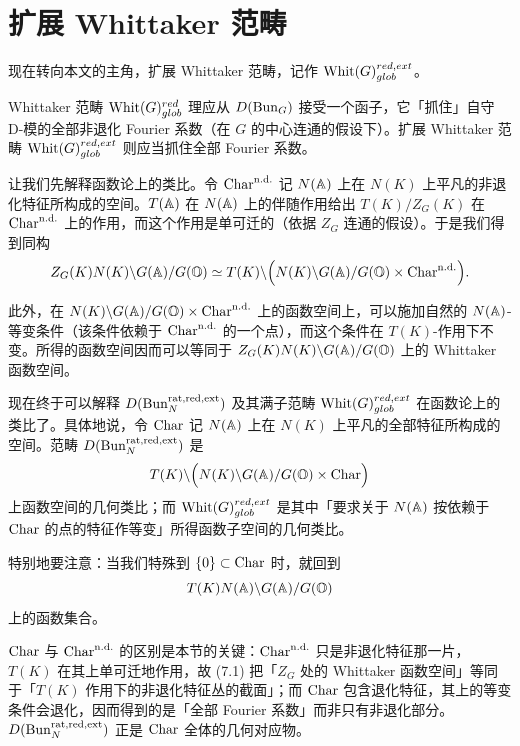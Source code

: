 \section{扩展 Whittaker 范畴}

现在转向本文的主角，扩展 Whittaker 范畴，记作 $\mathrm{Whit}(G)^{red,ext}_{glob}$。

Whittaker 范畴 $\mathrm{Whit}(G)^{red}_{glob}$ 理应从 $D(\operatorname{Bun}_G)$ 接受一个函子，它「抓住」自守 D-模的全部非退化 Fourier 系数（在 $G$ 的中心连通的假设下）。扩展 Whittaker 范畴 $\mathrm{Whit}(G)^{red,ext}_{glob}$ 则应当抓住全部 Fourier 系数。

让我们先解释函数论上的类比。令 $\mathrm{Char}^{\mathrm{n.d.}}$ 记 $N(\mathbb{A})$ 上在 $N(K)$ 上平凡的非退化特征所构成的空间。$T(\mathbb{A})$ 在 $N(\mathbb{A})$ 上的伴随作用给出 $T(K)/Z_G(K)$ 在 $\mathrm{Char}^{\mathrm{n.d.}}$ 上的作用，而这个作用是单可迁的（依据 $Z_G$ 连通的假设）。于是我们得到同构
\begin{equation}
  Z_G(K)N(K)\backslash G(\mathbb{A})/G(\mathbb O)
  \simeq
  T(K)\backslash\Bigl(N(K)\backslash G(\mathbb{A})/G(\mathbb O)\times\mathrm{Char}^{\mathrm{n.d.}}\Bigr).
  \label{eq:7.1}
\end{equation}

此外，在 $N(K)\backslash G(\mathbb{A})/G(\mathbb O)\times\mathrm{Char}^{\mathrm{n.d.}}$ 上的函数空间上，可以施加自然的 $N(\mathbb{A})$-等变条件（该条件依赖于 $\mathrm{Char}^{\mathrm{n.d.}}$ 的一个点），而这个条件在 $T(K)$-作用下不变。所得的函数空间因而可以等同于 $Z_G(K)N(K)\backslash G(\mathbb{A})/G(\mathbb O)$ 上的 Whittaker 函数空间。

现在终于可以解释 $D(\operatorname{Bun}^{\mathrm{rat},\mathrm{red},\mathrm{ext}}_N)$ 及其满子范畴 $\mathrm{Whit}(G)^{red,ext}_{glob}$ 在函数论上的类比了。具体地说，令 $\mathrm{Char}$ 记 $N(\mathbb{A})$ 上在 $N(K)$ 上平凡的全部特征所构成的空间。范畴 $D(\operatorname{Bun}^{\mathrm{rat},\mathrm{red},\mathrm{ext}}_N)$ 是
\[
  T(K)\backslash\Bigl(N(K)\backslash G(\mathbb{A})/G(\mathbb O)\times\mathrm{Char}\Bigr)
\]
上函数空间的几何类比；而 $\mathrm{Whit}(G)^{red,ext}_{glob}$ 是其中「要求关于 $N(\mathbb{A})$ 按依赖于 $\mathrm{Char}$ 的点的特征作等变」所得函数子空间的几何类比。

特别地要注意：当我们特殊到 $\{0\}\subset\mathrm{Char}$ 时，就回到
\[
  T(K)N(\mathbb{A})\backslash G(\mathbb{A})/G(\mathbb O)
\]
上的函数集合。

\begin{annote}
$\mathrm{Char}$ 与 $\mathrm{Char}^{\mathrm{n.d.}}$ 的区别是本节的关键：$\mathrm{Char}^{\mathrm{n.d.}}$ 只是非退化特征那一片，$T(K)$ 在其上单可迁地作用，故 (7.1) 把「$Z_G$ 处的 Whittaker 函数空间」等同于「$T(K)$ 作用下的非退化特征丛的截面」；而 $\mathrm{Char}$ 包含退化特征，其上的等变条件会退化，因而得到的是「全部 Fourier 系数」而非只有非退化部分。$D(\operatorname{Bun}^{\mathrm{rat},\mathrm{red},\mathrm{ext}}_N)$ 正是 $\mathrm{Char}$ 全体的几何对应物。\par\vspace{0.15em}{\raggedleft 【来源：原书 p.12 §7（A）；经典 Whittaker 模型中「非退化特征」与「全部特征」的对比（A）】\par}
\end{annote}

